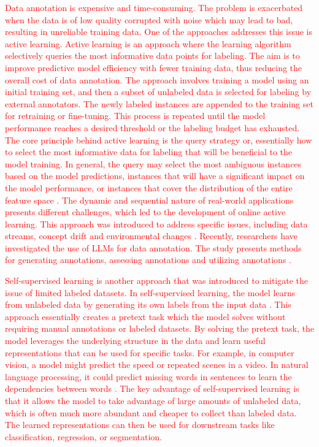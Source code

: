 \documentclass[preprint,12pt]{elsarticle}
\begin{document}
\textcolor{red}{Data annotation is expensive and time-consuming. The problem is exacerbated when the data is of low quality corrupted with noise which may lead to bad, resulting in unreliable training data. One of the approaches addresses this issue is active learning. Active learning is an approach where the learning algorithm selectively queries the most informative data points for labeling. The aim is to improve predictive model efficiency with fewer training data, thus reducing the overall cost of data annotation. The approach involves training a model using an initial training set, and then a subset of unlabeled data is selected for labeling by external annotators. The newly labeled instances are appended to the training set for retraining or fine-tuning. This process is repeated until the model performance reaches a desired threshold or the labeling budget has exhausted. The core principle behind active learning is the query strategy or, essentially how to select the most informative data for labeling that will be beneficial to the model training. In general, the query may select the most ambiguous instances based on the model predictions, instances that will have a significant impact on the model performance, or instances that cover the distribution of the entire feature space \citep{li_survey_2024}. The dynamic and sequential nature of real-world applications presents different challenges, which led to the development of online active learning. This approach was introduced to address specific issues, including data streams, concept drift and environmental changes \citep{cacciarelli_active_2024}. Recently, researchers have investigated the use of LLMs for data annotation. The study presents methods for generating annotations, assessing annotations and utilizing annotations \citep{tan_large_2024}.}

\textcolor{red}{Self-supervised learning is another approach that was introduced to mitigate the issue of limited labeled datasets. In self-supervised learning, the model learns from unlabeled data by generating its own labels from the input data \citep{gui_survey_2024}. This approach essentially creates a pretext task which the model solves without requiring manual annotations or labeled datasets. By solving the pretext task, the model leverages the underlying structure in the data and learn useful representations that can be used for specific tasks. For example, in computer vision, a model might predict the speed \citep{altabrawee_stclr_2025} or repeated scenes \citep{altabrawee_repeat_2024} in a video. In natural language processing, it could predict missing words in sentences to learn the dependencies between words \citep{lee_predicting_2021}. The key advantage of self-supervised learning is that it allows the model to take advantage of large amounts of unlabeled data, which is often much more abundant and cheaper to collect than labeled data. The learned representations can then be used for downstream tasks like classification, regression, or segmentation.}
\end{document}
